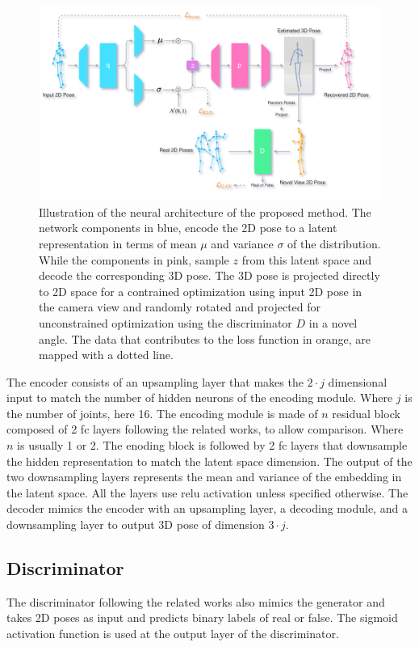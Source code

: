\begin{figure}[h]
    \centering
    \includegraphics[width=\textwidth]{figures/arch/method_arch.png}
    \caption{Illustration of the neural architecture of the proposed method. The network components in blue, encode the 2D pose to a latent representation in terms of mean $\mu$ and variance $\sigma$ of the distribution. While the components in pink, sample $z$ from this latent space and decode the corresponding 3D pose. The 3D pose is projected directly to 2D space for a contrained optimization using input 2D pose in the camera view and randomly rotated and projected for unconstrained optimization using the discriminator $D$ in a novel angle. The data that contributes to the loss function in orange, are mapped with a dotted line.  
    }
    \label{fig:method_arch}
\end{figure}

The encoder consists of an upsampling layer that makes the $2 \cdot j$ dimensional input to match the number of hidden neurons of the encoding module. Where $j$ is the number of joints, here 16. The encoding module is made of $n$ residual block composed of 2 \ac{fc} layers following the related works, to allow comparison. Where $n$ is usually 1 or 2. The enoding block is followed by 2 \ac{fc} layers that downsample the hidden representation to match the latent space dimension. The output of the two downsampling layers represents the mean and variance of the embedding in the latent space. All the layers use \ac{relu} activation unless specified otherwise. The decoder mimics the encoder with an upsampling layer, a decoding module, and a downsampling layer to output 3D pose of dimension $3 \cdot j$.

\subsection{Discriminator}%
The discriminator following the related works also mimics the generator and takes 2D poses as input and predicts binary labels of real or false. The sigmoid activation function is used at the output layer of the discriminator.

